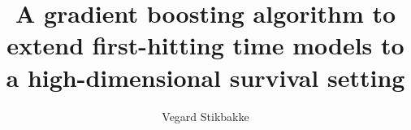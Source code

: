 \documentclass[a4paper, USenglish, dvipsnames, svgnames, cmyk]{memoir}
\title{A gradient boosting algorithm to extend first-hitting time models to a high-dimensional survival setting}
\author
{
    Vegard Stikbakke
}
\begin{document}
    \frontmatter        %

    \masterfrontpage

    
    
    \cleartorecto
    
    \cleartorecto

    

    \cleartorecto
    \begin{KeepFromToc}
      \tableofcontents
    \end{KeepFromToc}

    \mainmatter         %

    

    

    

    

    

    

    

    

    \appendix           %
    \appendixpage       %

    

    

    \backmatter         %

    
    
\end{document}
